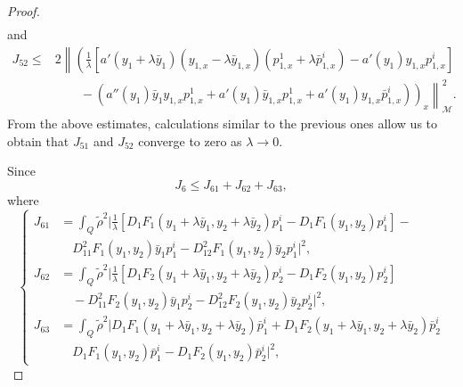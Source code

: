 \documentclass[10pt,a4paper]{amsart}
\begin{document}
\begin{proof}
\begin{equation*}
\begin{split}
        \end{split}
    \end{equation*}
    and
    \begin{equation*}
        \begin{split}
            J_{52} \leq &2\left\| \left( \frac{1}{\lambda} \left[ a'(y_1+\lambda\bar y_1)(y_{1,x}-\lambda\bar y_{1,x})(p^1_{1,x}+\lambda\bar p^i_{1,x} ) - a'(y_1)y_{1,x}p^i_{1,x} \right] \right.\right. \\
            &\left.\left. \qquad - (a''(y_1)\bar y_1 y_{1,x} p^1_{1,x} + a'(y_1)\bar y_{1,x} p^1_{1,x} + a'(y_1)y_{1,x}\bar p^i_{1,x}) \right)_x\right\|^{2}_{\mathcal{M}}.
        \end{split}
    \end{equation*}From the above estimates, calculations similar to the previous ones allow us to obtain that $J_{51}$ and $J_{52}$ converge to zero as $\lambda \to 0$.

    \noindent Since 
    \begin{equation*}
    J_6 \leq     J_{61} + J_{62} + J_{63},
    \end{equation*}where
    \begin{equation*}
    \begin{cases}
    J_{61} &= \displaystyle \int_Q \tilde\rho^2 \Big| \frac{1}{\lambda}\left[D_1 F_1(y_1+\lambda \bar y_1,y_2+\lambda \bar y_2) p^i_1 - D_1 F_1(y_1,y_2) p^i_1 \right] - \\
   & \quad D_{11}^2 F_1(y_1,y_2)\bar y_1 p^i_1 - D_{12}^2 F_1(y_1,y_2)\bar y_2 p^i_1\Big|^2, \\
   J_{62} &= \displaystyle \int_Q \tilde\rho^2 \Big| \frac{1}{\lambda}\left[ D_1 F_2(y_1+\lambda \bar y_1,y_2+\lambda \bar y_2) p^i_2  - D_1 F_2(y_1,y_2) p^i_2 \right] \\
   & \quad - D_{11}^2 F_2(y_1,y_2)\bar y_1 p^i_2 - D_{12}^2 F_2(y_1,y_2)\bar y_2 p^i_2 \Big|^2,\\
   J_{63} &= \displaystyle \int_Q \tilde\rho^2 \Big| D_1 F_1(y_1+\lambda \bar y_1,y_2+\lambda \bar y_2) \bar p^i_1 + D_1 F_2(y_1+\lambda \bar y_1,y_2+\lambda \bar y_2) \bar p^i_2 \\
   & \quad D_1 F_1(y_1,y_2) \bar p^i_1 - D_1 F_2(y_1,y_2) \bar p^i_2 \Big|^2,
    \end{cases}
    \end{equation*}
    

\end{proof}
\end{document}
